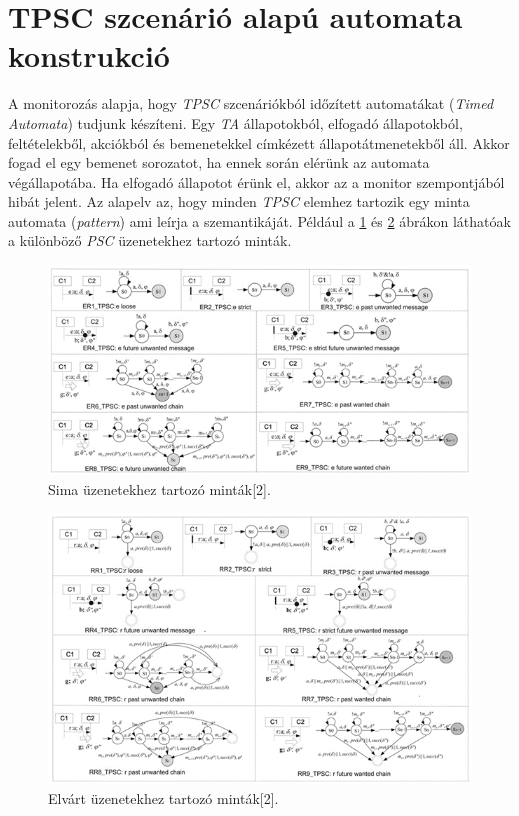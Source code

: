 \clearpage\section{TPSC szcenárió alapú automata konstrukció}

A monitorozás alapja, hogy \textit{TPSC} szcenáriókból időzített automatákat (\textit{Timed Automata}) tudjunk készíteni.
Egy \textit{TA} állapotokból, elfogadó állapotokból, feltételekből, akciókból és bemenetekkel címkézett állapotátmenetekből áll.
Akkor fogad el egy bemenet sorozatot, ha ennek során elérünk az automata végállapotába.
Ha elfogadó állapotot érünk el, akkor az a monitor szempontjából hibát jelent.
Az alapelv az, hogy minden \textit{TPSC} elemhez tartozik egy minta automata (\textit{pattern}) ami leírja a szemantikáját.
Például a \ref{tpsc_sima} és \ref{tpsc_elvárt} ábrákon láthatóak a különböző \textit{PSC} üzenetekhez tartozó minták.

\begin{figure}[!ht]
    \centering
    \includegraphics[width=150mm, keepaspectratio]{figures/5abra.png}
    \caption{Sima üzenetekhez tartozó minták[2].}
    \label{tpsc_sima}
\end{figure}

\begin{figure}[!ht]
    \centering
    \includegraphics[width=150mm, keepaspectratio]{figures/6abra.png}
    \caption{Elvárt üzenetekhez tartozó minták[2].}
    \label{tpsc_elvárt}
\end{figure}

